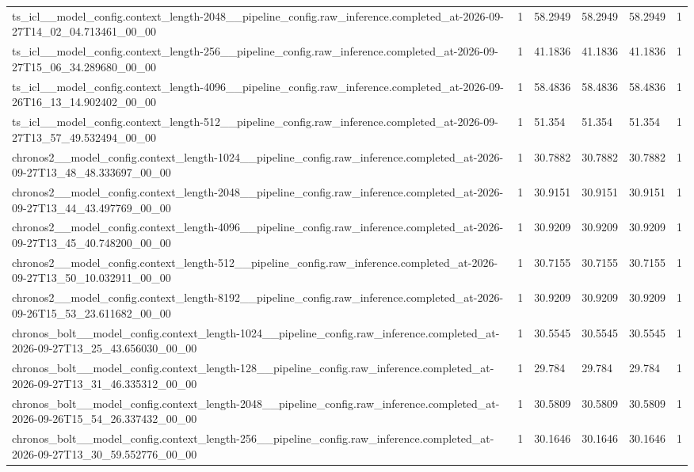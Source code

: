 \begin{tabular}{llllll}
ts\_icl\_\_model\_config.context\_length-2048\_\_pipeline\_config.raw\_inference.completed\_at-2026-09-27T14\_02\_04.713461\_00\_00 & 1 & 58.2949 & 58.2949 & 58.2949 & 1 \\
ts\_icl\_\_model\_config.context\_length-256\_\_pipeline\_config.raw\_inference.completed\_at-2026-09-27T15\_06\_34.289680\_00\_00 & 1 & 41.1836 & 41.1836 & 41.1836 & 1 \\
ts\_icl\_\_model\_config.context\_length-4096\_\_pipeline\_config.raw\_inference.completed\_at-2026-09-26T16\_13\_14.902402\_00\_00 & 1 & 58.4836 & 58.4836 & 58.4836 & 1 \\
ts\_icl\_\_model\_config.context\_length-512\_\_pipeline\_config.raw\_inference.completed\_at-2026-09-27T13\_57\_49.532494\_00\_00 & 1 & 51.354 & 51.354 & 51.354 & 1 \\
chronos2\_\_model\_config.context\_length-1024\_\_pipeline\_config.raw\_inference.completed\_at-2026-09-27T13\_48\_48.333697\_00\_00 & 1 & 30.7882 & 30.7882 & 30.7882 & 1 \\
chronos2\_\_model\_config.context\_length-2048\_\_pipeline\_config.raw\_inference.completed\_at-2026-09-27T13\_44\_43.497769\_00\_00 & 1 & 30.9151 & 30.9151 & 30.9151 & 1 \\
chronos2\_\_model\_config.context\_length-4096\_\_pipeline\_config.raw\_inference.completed\_at-2026-09-27T13\_45\_40.748200\_00\_00 & 1 & 30.9209 & 30.9209 & 30.9209 & 1 \\
chronos2\_\_model\_config.context\_length-512\_\_pipeline\_config.raw\_inference.completed\_at-2026-09-27T13\_50\_10.032911\_00\_00 & 1 & 30.7155 & 30.7155 & 30.7155 & 1 \\
chronos2\_\_model\_config.context\_length-8192\_\_pipeline\_config.raw\_inference.completed\_at-2026-09-26T15\_53\_23.611682\_00\_00 & 1 & 30.9209 & 30.9209 & 30.9209 & 1 \\
chronos\_bolt\_\_model\_config.context\_length-1024\_\_pipeline\_config.raw\_inference.completed\_at-2026-09-27T13\_25\_43.656030\_00\_00 & 1 & 30.5545 & 30.5545 & 30.5545 & 1 \\
chronos\_bolt\_\_model\_config.context\_length-128\_\_pipeline\_config.raw\_inference.completed\_at-2026-09-27T13\_31\_46.335312\_00\_00 & 1 & 29.784 & 29.784 & 29.784 & 1 \\
chronos\_bolt\_\_model\_config.context\_length-2048\_\_pipeline\_config.raw\_inference.completed\_at-2026-09-26T15\_54\_26.337432\_00\_00 & 1 & 30.5809 & 30.5809 & 30.5809 & 1 \\
chronos\_bolt\_\_model\_config.context\_length-256\_\_pipeline\_config.raw\_inference.completed\_at-2026-09-27T13\_30\_59.552776\_00\_00 & 1 & 30.1646 & 30.1646 & 30.1646 & 1 \\

\end{tabular}
